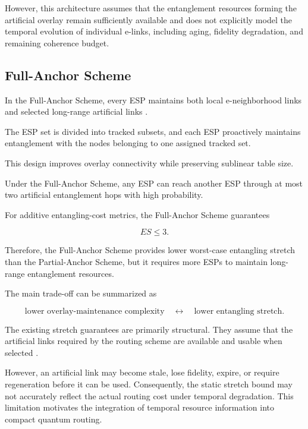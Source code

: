 However, this architecture assumes that the entanglement resources forming the artificial overlay remain sufficiently available and does not explicitly model the temporal evolution of individual e-links, including aging, fidelity degradation, and remaining coherence budget.
\subsection{Full-Anchor Scheme}

In the Full-Anchor Scheme, every ESP maintains both local e-neighborhood links and selected long-range artificial links \cite{caleffi2025quantumarchitecture}.

The ESP set is divided into tracked subsets, and each ESP proactively maintains entanglement with the nodes belonging to one assigned tracked set.

This design improves overlay connectivity while preserving sublinear table size.

Under the Full-Anchor Scheme, any ESP can reach another ESP through at most two artificial entanglement hops with high probability.

For additive entangling-cost metrics, the Full-Anchor Scheme guarantees

\begin{equation}
    ES
    \leq
    3.
\end{equation}

Therefore, the Full-Anchor Scheme provides lower worst-case entangling stretch than the Partial-Anchor Scheme, but it requires more ESPs to maintain long-range entanglement resources.

The main trade-off can be summarized as

\begin{equation}
    \text{lower overlay-maintenance complexity}
    \quad
    \longleftrightarrow
    \quad
    \text{lower entangling stretch}.
\end{equation}

The existing stretch guarantees are primarily structural. They assume that the artificial links required by the routing scheme are available and usable when selected \cite{caleffi2025quantumarchitecture}.

However, an artificial link may become stale, lose fidelity, expire, or require regeneration before it can be used. Consequently, the static stretch bound may not accurately reflect the actual routing cost under temporal degradation. This limitation motivates the integration of temporal resource information into compact quantum routing.

